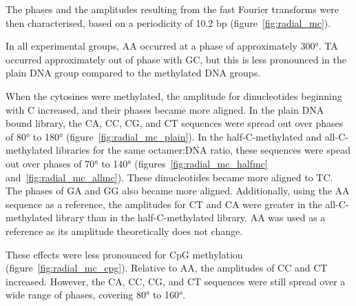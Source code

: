 \documentclass[parskip=full, numbers=noenddot]{scrreprt}
\begin{document}
The phases and the amplitudes resulting from the fast Fourier transforms were then characterised, based on a periodicity of 10.2 bp (figure~\ref{fig:radial_mc}).

In all experimental groups, AA occurred at a phase of approximately \ang{300}.  TA occurred approximately out of phase with GC, but this is less pronounced in the plain DNA group compared to the methylated DNA groups.

When the cytosines were methylated, the amplitude for dinucleotides beginning with C increased, and their phases became more aligned.  In the plain DNA bound library, the CA, CC, CG, and CT sequences were spread out over phases of \ang{80} to \ang{180} (figure~\ref{fig:radial_mc_plain}).  In the half-C-methylated and all-C-methylated libraries for the same octamer:DNA ratio, these sequences were spead out over phases of \ang{70} to \ang{140} (figures~\ref{fig:radial_mc_halfmc} and~\ref{fig:radial_mc_allmc}).  These dinucleotides became more aligned to TC.  The phases of GA and GG also became more aligned.  Additionally, using the AA sequence as a reference, the amplitudes for CT and CA were greater in the all-C-methylated library than in the half-C-methylated library.  AA was used as a reference as its amplitude theoretically does not change. %

These effects were less pronounced for CpG methylation (figure~\ref{fig:radial_mc_cpg}).  Relative to AA, the amplitudes of CC and CT increased.  However, the CA, CC, CG, and CT sequences were still spread over a wide range of phases, covering \ang{80} to \ang{160}.
\end{document}
